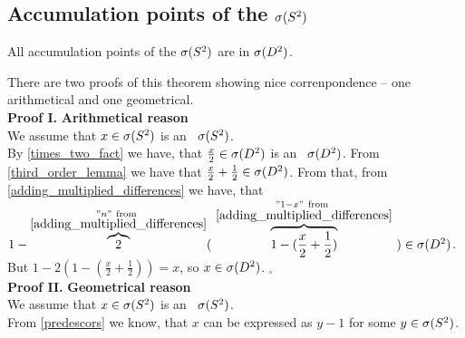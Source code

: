 \subsection{Accumulation points of the ${{\sigma}(S^2)}$}
\begin{theorem}
All accumulation points of the ${{\sigma}(S^2)}$ are in ${{\sigma}(D^2)}$.
\end{theorem}
There are two proofs of this theorem showing nice correnpondence -- one arithmetical and 
one geometrical. 
\\
\textbf{Proof I.}
\textbf{Arithmetical reason} \\
We assume that $x \in {{\sigma}(S^2)}$ is an \apots\ ${{\sigma}(S^2)}$.\\
By \ref{times_two_fact} we have, that 
$\frac{x}{2} \in {{\sigma}(D^2)}$ is an \apots\ ${{\sigma}(D^2)}$. From \ref{third_order_lemma} we have that 
$\frac{x}{2} + \frac{1}{2} \in {{\sigma}(D^2)}$. From that, from \ref{adding_multiplied_differences} 
we have, 
that $1-\overbrace{2}^{\substack{"n"\rm\ from\ \\ 
\rm \ref{adding_multiplied_differences}}} 
(\ \overbrace{1-(\frac{x}{2}+\frac{1}{2})}^{\substack{"1-x"\rm\ 
from\ \\ \rm \ref{adding_multiplied_differences}}}\ ) \in \speD$. But $1 - 2(1-(\frac{x}{2}+
\frac{1}{2})) = x$, so $x \in {{\sigma}(D^2)}$. $_\square$
\\[2pt]
\textbf{Proof II.}
\textbf{Geometrical reason} \\
We assume that $x \in {{\sigma}(S^2)}$ is an \apots\ ${{\sigma}(S^2)}$.\\
From \ref{predescors} we know, that $x$ can be expressed as $y - 1$ for some $y \in {{\sigma}(S^2)}$. \\
